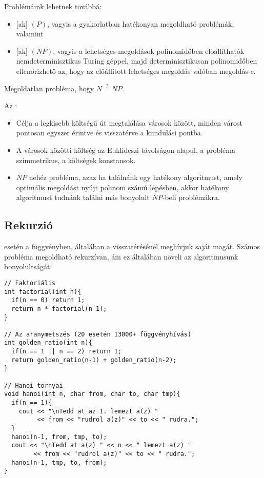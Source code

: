 \documentclass[../../main.tex]{subfiles}
\begin{document}
Problémáink lehetnek továbbá:
\begin{itemize}
  \item {}[ak] $(P)$, vagyis a gyakorlatban
        hatékonyan megoldható problémák, valamint
  \item {}[ak] $(NP)$, vagyis a lehetséges megoldások
        polinomidőben előállíthatók nemdeterminisztikus Turing géppel,
        majd determinisztikusan polinomidőben ellenőrizhető az,
        hogy az előállított lehetséges megoldás valóban megoldás-e.
\end{itemize}
Megoldatlan probléma, hogy $N \overset{?}{=} NP$.

Az :
\begin{itemize}
  \item Célja a legkisebb költségű út megtalálása városok között, minden
        várost pontosan egyszer érintve és visszatérve a kiindulási pontba.

  \item A városok közötti költség az Euklideszi távolságon alapul,
        a probléma szimmetrikus, a költségek konstansok.

  \item $NP$ nehéz probléma, azaz ha találnánk egy hatékony algoritmust,
        amely optimális megoldást nyújt polinom számú lépésben, akkor hatékony
        algoritmust tudnánk találni más bonyolult $NP$-beli problémákra.
\end{itemize}

\subsection{Rekurzió}

 esetén a függvényben, általában a visszatérésénél meghívjuk
saját magát. Számos probléma megoldható rekurzívan, ám ez általában növeli
az algoritmusunk bonyolultságát:

\begin{verbatim}
// Faktoriális
int factorial(int n){
  if(n == 0) return 1;
  return n * factorial(n-1);
}

// Az aranymetszés (20 esetén 13000+ függvényhívás)
int golden_ratio(int n){
  if(n == 1 || n == 2) return 1;
  return golden_ratio(n-1) + golden_ratio(n-2);
}

// Hanoi tornyai
void hanoi(int n, char from, char to, char tmp){
  if(n == 1){
    cout << "\nTedd at az 1. lemezt a(z) "
         << from << "rudrol a(z)" << to << " rudra.";
  }
  hanoi(n-1, from, tmp, to);
  cout << "\nTedd at a(z) " << n << " lemezt a(z) "
        << from << "rudrol a(z)" << to << " rudra.";
  hanoi(n-1, tmp, to, from);
}
\end{verbatim}
\end{document}
